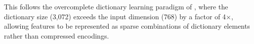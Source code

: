 \documentclass[12pt]{article}
\begin{document}
This follows the overcomplete dictionary learning paradigm of \citet{bricken2023monosemanticity}, where the dictionary size (3,072) exceeds the input dimension (768) by a factor of 4$\times$, allowing features to be represented as sparse combinations of dictionary elements rather than compressed encodings.



\end{document}
